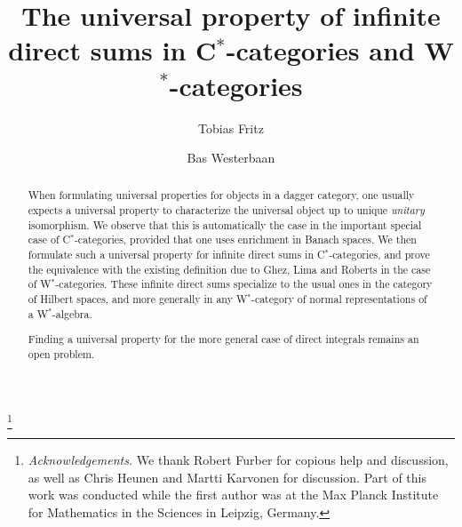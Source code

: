 \documentclass[reqno,T1,11pt]{amsproc}
\theoremstyle{plain}
\theoremstyle{remark}
\numberwithin{equation}{section}
\begin{document}
\sloppy

\setlength{\jot}{6pt}



\title[Infinite direct sums in C$^*$-categories and W$^*$-categories]{The universal property of infinite direct sums in C$^*$-categories and W$^*$-categories}

\author{Tobias Fritz}
\author{Bas Westerbaan}

\address{Perimeter Institute for Theoeretical Physics, Waterloo, Ontario, Canada}

\address{Institute for Computing and Information Sciences, Radboud Universiteit Nijmegen, The Netherlands}

\keywords{}


\thanks{\textit{Acknowledgements.} We thank Robert Furber for copious
help and discussion, as well as Chris Heunen and Martti Karvonen
for discussion. Part of this work was conducted while the first
author was at the Max Planck Institute for Mathematics in the
Sciences in Leipzig, Germany.}

\begin{abstract}
When formulating universal properties for objects in a dagger category, one usually expects a universal property to characterize the universal object up to unique \emph{unitary} isomorphism. We observe that this is automatically the case in the important special case of C$^*$-categories, provided that one uses enrichment in Banach spaces. We then formulate such a universal property for infinite direct sums in C$^*$-categories, and prove the equivalence with the existing definition due to Ghez, Lima and Roberts in the case of W$^*$-categories. These infinite direct sums specialize to the usual ones in the category of Hilbert spaces, and more generally in any W$^*$-category of normal representations of a W$^*$-algebra.

Finding a universal property for the more general case of direct integrals remains an open problem.
\end{abstract}

\maketitle
\end{document}
